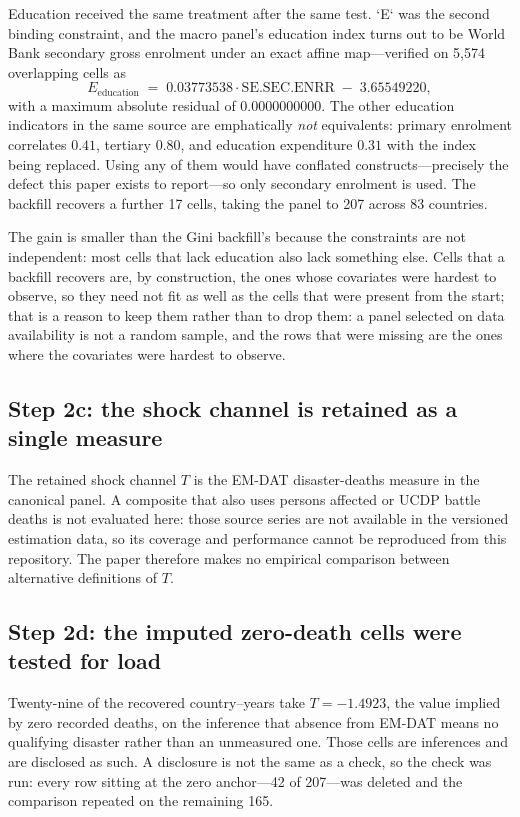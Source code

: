 \documentclass[11pt]{article}
\begin{document}
Education received the same treatment after the same test. `E` was the second
binding constraint, and the macro panel's education index turns out to be World
Bank secondary gross enrolment under an exact affine map---verified on 5{,}574
overlapping cells as
\[
E_{\text{education}} \;=\; \num{0.03773538}\cdot \text{SE.SEC.ENRR} \;-\; \num{3.65549220},
\]
with a maximum absolute residual of \num{0.0000000000}. The other education
indicators in the same source are emphatically \emph{not} equivalents: primary
enrolment correlates $0.41$, tertiary $0.80$, and education expenditure $0.31$
with the index being replaced. Using any of them would have conflated
constructs---precisely the defect this paper exists to report---so only
secondary enrolment is used. The backfill recovers a further 17 cells, taking
the panel to \num{207} across \num{83} countries.

The gain is smaller than the Gini backfill's because the constraints are not
independent: most cells that lack education also lack something else. Cells that a
backfill recovers are, by construction, the ones whose covariates were hardest to
observe, so they need not fit as well as the cells that were present from the
start; that is a reason to keep them rather than to drop them: a panel
selected on data availability is not a random sample, and the rows that were
missing are the ones where the covariates were hardest to observe.

\subsection*{Step 2c: the shock channel is retained as a single measure}\label{sec:trauma-composite}
The retained shock channel $T$ is the EM-DAT disaster-deaths measure in the canonical panel. A composite that also uses persons affected or UCDP battle deaths is not evaluated here: those source series are not available in the versioned estimation data, so its coverage and performance cannot be reproduced from this repository. The paper therefore makes no empirical comparison between alternative definitions of $T$.

\subsection*{Step 2d: the imputed zero-death cells were tested for load}\label{sec:zero-fill-sensitivity}
Twenty-nine of the recovered country--years take $T=\num{-1.4923}$, the value implied by zero recorded deaths, on the inference that absence from EM-DAT means no qualifying disaster rather than an unmeasured one. Those cells are inferences and are disclosed as such. A disclosure is not the same as a check, so the check was run: every row sitting at the zero anchor---\num{42} of \num{207}---was deleted and the comparison repeated on the remaining \num{165}.
\end{document}
